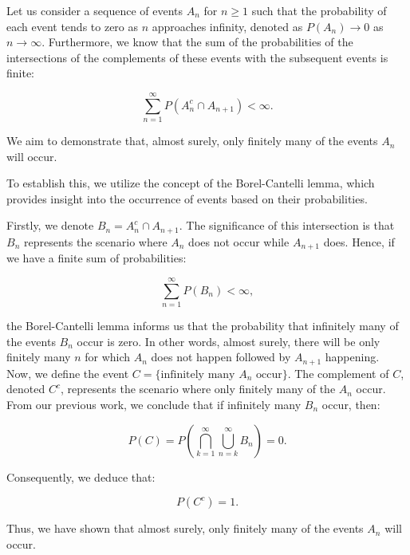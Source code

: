 \begin{exercise}
    Let us consider a sequence of events \( A_n \) for \( n \geq 1 \) such that the probability of each event tends to zero as \( n \) approaches infinity, denoted as \( P(A_n) \to 0 \) as \( n \to \infty \). Furthermore, we know that the sum of the probabilities of the intersections of the complements of these events with the subsequent events is finite:

    \[
    \sum_{n=1}^{\infty} P(A_n^c \cap A_{n+1}) < \infty.
    \]
    
    We aim to demonstrate that, almost surely, only finitely many of the events \( A_n \) will occur.     
\end{exercise}

\begin{solution}
    To establish this, we utilize the concept of the Borel-Cantelli lemma, which provides insight into the occurrence of events based on their probabilities. 

Firstly, we denote \( B_n = A_n^c \cap A_{n+1} \). The significance of this intersection is that \( B_n \) represents the scenario where \( A_n \) does not occur while \( A_{n+1} \) does. Hence, if we have a finite sum of probabilities:

\[
\sum_{n=1}^{\infty} P(B_n) < \infty,
\]

the Borel-Cantelli lemma informs us that the probability that infinitely many of the events \( B_n \) occur is zero. In other words, almost surely, there will be only finitely many \( n \) for which \( A_n \) does not happen followed by \( A_{n+1} \) happening. \\

Now, we define the event \( C = \{ \text{infinitely many } A_n \text{ occur} \} \). The complement of \( C \), denoted \( C^c \), represents the scenario where only finitely many of the \( A_n \) occur. \\

From our previous work, we conclude that if infinitely many \( B_n \) occur, then:

\[
P(C) = P\left(\bigcap_{k=1}^{\infty} \bigcup_{n=k}^{\infty} B_n\right) = 0.
\]

Consequently, we deduce that:

\[
P(C^c) = 1.
\]

Thus, we have shown that almost surely, only finitely many of the events \( A_n \) will occur. 
\end{solution}


